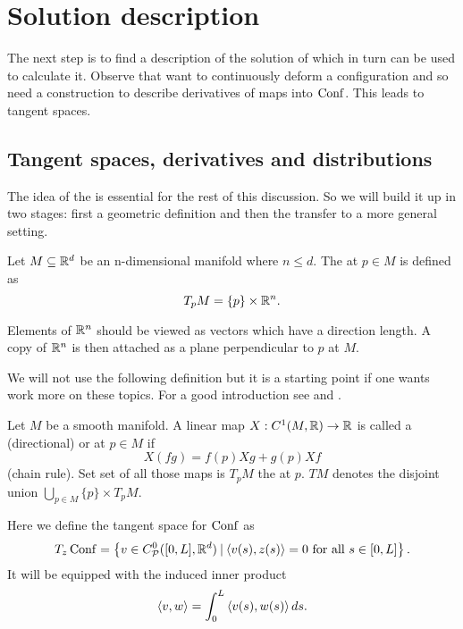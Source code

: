 \section{Solution description}\label{sec:descr}
The next step is to find a description of the solution of 
which in turn can be used to calculate it. Observe that want to continuously
deform a configuration and so need a construction to describe derivatives
of maps into $\operatorname{Conf}$. This leads to tangent spaces.

\subsection{Tangent spaces, derivatives and distributions}
The idea of the  is essential for the rest of this discussion.
So we will build it up in two stages: first a geometric definition and then
the transfer to a more general setting.

\begin{definition}
    Let $M \subseteq \mathbb{R}^d$ be an n-dimensional manifold where $n \leq d$.
    The  at $p \in M$ is defined as
        \[ T_pM = \{p\} \times \mathbb{R}^n . \]
\end{definition}

\begin{remark}
    Elements of $\mathbb{R}^n$ should be viewed as vectors which have a direction
    length. A copy of $\mathbb{R}^n$ is then attached as a plane perpendicular to
    $p$ at $M$.
\end{remark}

We will not use the following definition but it is a starting point if one wants
work more on these topics. For a good introduction see \cite[Chapter 3]{JLee}
and \cite[Section 5B]{Kuehnel}.

\begin{definition}
    Let $M$ be a smooth manifold. A linear map $X : C^{1}({M}, {\mathbb{R}}) \rightarrow \mathbb{R}$
    is called a (directional)  or  at $p \in M$ if
        \[ X(fg) = f(p)Xg + g(p)Xf \]
    (chain rule). Set set of all those maps is $T_pM$ the 
    at $p$. $TM$ denotes the disjoint union $\bigcup_{p \in M} \{p\} \times T_pM$.
\end{definition}

Here we define the tangent space for $\operatorname{Conf}$ as
    \[ T_z\operatorname{Conf}
        = \left\{{v \in C^{0}_{\mathcal{P}}({[0,L]}, {\mathbb{R}^d})} \:|\: {\left\langle{v(s)},{z(s)}\right\rangle = 0 \text{ for all } s \in [0,L]}\right\}.
    \]
It will be equipped with the induced inner product
    \[ \left\langle{v},{w}\right\rangle = \int_0^L \left\langle{v(s)},{w(s)}\right\rangle ds . \]

